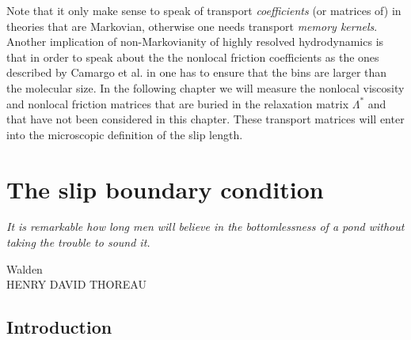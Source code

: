 \documentclass[b5paper,openright,10pt]{book}
\begin{document}
Note   that   it    only   make   sense   to    speak   of   transport
\textit{coefficients} (or matrices of) in theories that are Markovian,
otherwise  one  needs   transport  \textit{memory  kernels}.   Another
implication of  non-Markovianity of  highly resolved  hydrodynamics is
that in order to speak about the the nonlocal friction coefficients as
the ones described  by Camargo et al. in  \cite{CamargoBC2018} one has
to ensure  that the bins  are larger than  the molecular size.  In the
following chapter we will measure  the nonlocal viscosity and nonlocal
friction matrices that are buried in the relaxation matrix $\Lambda^*$
and that  have not been  considered in this chapter.   These transport
matrices will enter into the  microscopic definition of the slip
length.


\chapter{The slip boundary condition}
\label{Chap:Slip}
\epigraph{\textit{It is remarkable how long men will believe in the bottomlessness of a pond without taking the trouble to sound it.}}{Walden \\ HENRY DAVID THOREAU}

\section{Introduction}
\end{document}
